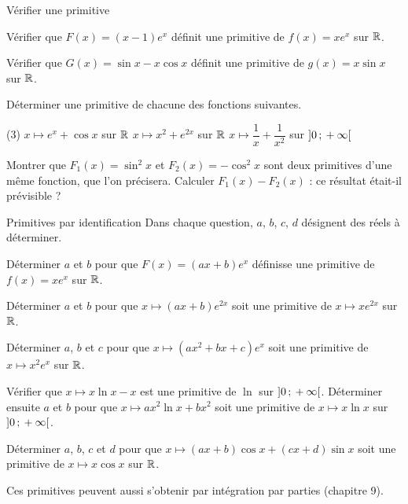 \begin{exercice}[2]{Vérifier une primitive}
\begin{questions}
  \item Vérifier que $F(x)=(x-1)e^{x}$ définit une primitive de $f(x)=xe^{x}$ sur $\mathbb{R}$.
  \item Vérifier que $G(x)=\sin x-x\cos x$ définit une primitive de $g(x)=x\sin x$ sur $\mathbb{R}$.
  \item Déterminer une primitive de chacune des fonctions suivantes.
\begin{tasks}(3)
  \task $x\mapsto e^{x}+\cos x$ sur $\mathbb{R}$
  \task $x\mapsto x^{2}+e^{2x}$ sur $\mathbb{R}$
  \task $x\mapsto\dfrac1x+\dfrac{1}{x^{2}}$ sur $\mathopen{]}0\,{;}\,+\infty\mathclose{[}$
\end{tasks}
  \item Montrer que $F_1(x)=\sin^{2}x$ et $F_2(x)=-\cos^{2}x$ sont deux primitives d'une même fonction, que l'on précisera.
    Calculer $F_1(x)-F_2(x)$ : ce résultat était-il prévisible ?
\end{questions}
\end{exercice}


\begin{exercice}[3]{Primitives par identification}
Dans chaque question, $a$, $b$, $c$, $d$ désignent des réels à déterminer.
\begin{questions}
  \item Déterminer $a$ et $b$ pour que $F(x)=(ax+b)e^{x}$ définisse une primitive de $f(x)=xe^{x}$ sur $\mathbb{R}$.
  \item Déterminer $a$ et $b$ pour que $x\mapsto(ax+b)e^{2x}$ soit une primitive de $x\mapsto xe^{2x}$ sur $\mathbb{R}$.
  \item Déterminer $a$, $b$ et $c$ pour que $x\mapsto\left(ax^{2}+bx+c\right)e^{x}$ soit une primitive de $x\mapsto x^{2}e^{x}$ sur $\mathbb{R}$.
  \item Vérifier que $x\mapsto x\ln x-x$ est une primitive de $\ln$ sur $\mathopen{]}0\,{;}\,+\infty\mathclose{[}$. Déterminer ensuite $a$ et $b$ pour que
    $x\mapsto ax^{2}\ln x+bx^{2}$ soit une primitive de $x\mapsto x\ln x$ sur $\mathopen{]}0\,{;}\,+\infty\mathclose{[}$.
  \item Déterminer $a$, $b$, $c$ et $d$ pour que $x\mapsto(ax+b)\cos x+(cx+d)\sin x$ soit une primitive de $x\mapsto x\cos x$ sur $\mathbb{R}$.
\end{questions}
{\small\color{otMuted}Ces primitives peuvent aussi s'obtenir par intégration par parties (chapitre 9).}
\end{exercice}

